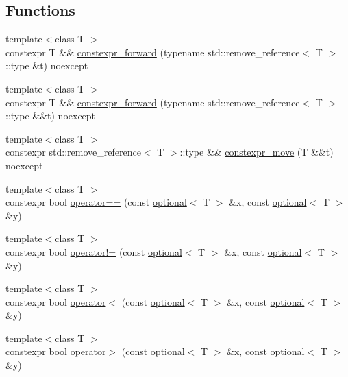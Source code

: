 \subsection*{Functions}
\begin{DoxyCompactItemize}
\item 
{\footnotesize template$<$class T $>$ }\\constexpr T \&\& \mbox{\hyperlink{namespacestd_1_1experimental_ad6c79ef527ee25f0a6295128c4b51f89}{constexpr\+\_\+forward}} (typename std\+::remove\+\_\+reference$<$ T $>$\+::type \&t) noexcept
\item 
{\footnotesize template$<$class T $>$ }\\constexpr T \&\& \mbox{\hyperlink{namespacestd_1_1experimental_a9bcca6a02f6e3005b3180962429c6feb}{constexpr\+\_\+forward}} (typename std\+::remove\+\_\+reference$<$ T $>$\+::type \&\&t) noexcept
\item 
{\footnotesize template$<$class T $>$ }\\constexpr std\+::remove\+\_\+reference$<$ T $>$\+::type \&\& \mbox{\hyperlink{namespacestd_1_1experimental_abe16b4d69976581fbfc135b809b3ffe3}{constexpr\+\_\+move}} (T \&\&t) noexcept
\item 
{\footnotesize template$<$class T $>$ }\\constexpr bool \mbox{\hyperlink{namespacestd_1_1experimental_a0bd6ca198e90eb70255e0b370072f154}{operator==}} (const \mbox{\hyperlink{classstd_1_1experimental_1_1optional}{optional}}$<$ T $>$ \&x, const \mbox{\hyperlink{classstd_1_1experimental_1_1optional}{optional}}$<$ T $>$ \&y)
\item 
{\footnotesize template$<$class T $>$ }\\constexpr bool \mbox{\hyperlink{namespacestd_1_1experimental_abf45cbc40acb4929dbf1caa3b31460d9}{operator!=}} (const \mbox{\hyperlink{classstd_1_1experimental_1_1optional}{optional}}$<$ T $>$ \&x, const \mbox{\hyperlink{classstd_1_1experimental_1_1optional}{optional}}$<$ T $>$ \&y)
\item 
{\footnotesize template$<$class T $>$ }\\constexpr bool \mbox{\hyperlink{namespacestd_1_1experimental_a27caacd2780817469b565c269933185d}{operator$<$}} (const \mbox{\hyperlink{classstd_1_1experimental_1_1optional}{optional}}$<$ T $>$ \&x, const \mbox{\hyperlink{classstd_1_1experimental_1_1optional}{optional}}$<$ T $>$ \&y)
\item 
{\footnotesize template$<$class T $>$ }\\constexpr bool \mbox{\hyperlink{namespacestd_1_1experimental_a1d2409f0cb8fda0ec9a0b9d5e1e61cb5}{operator$>$}} (const \mbox{\hyperlink{classstd_1_1experimental_1_1optional}{optional}}$<$ T $>$ \&x, const \mbox{\hyperlink{classstd_1_1experimental_1_1optional}{optional}}$<$ T $>$ \&y)

\end{DoxyCompactItemize}
